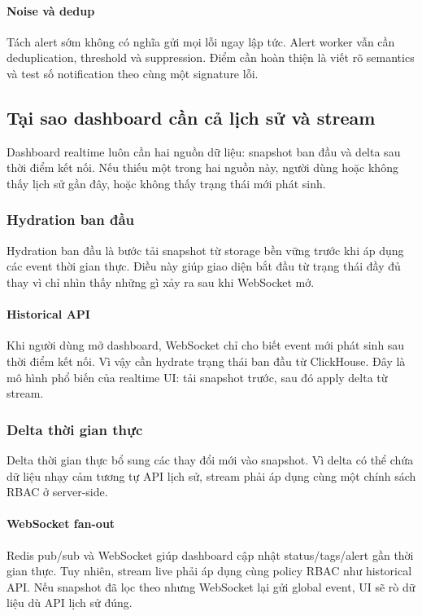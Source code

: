 \paragraph{Noise và dedup}
Tách alert sớm không có nghĩa gửi mọi lỗi ngay lập tức. Alert worker vẫn cần deduplication, threshold và suppression. Điểm cần hoàn thiện là viết rõ semantics và test số notification theo cùng một signature lỗi.

\subsection{Tại sao dashboard cần cả lịch sử và stream}

Dashboard realtime luôn cần hai nguồn dữ liệu: snapshot ban đầu và delta sau thời điểm kết nối. Nếu thiếu một trong hai nguồn này, người dùng hoặc không thấy lịch sử gần đây, hoặc không thấy trạng thái mới phát sinh.
\subsubsection{Hydration ban đầu}

Hydration ban đầu là bước tải snapshot từ storage bền vững trước khi áp dụng các event thời gian thực. Điều này giúp giao diện bắt đầu từ trạng thái đầy đủ thay vì chỉ nhìn thấy những gì xảy ra sau khi WebSocket mở.
\paragraph{Historical API}
Khi người dùng mở dashboard, WebSocket chỉ cho biết event mới phát sinh sau thời điểm kết nối. Vì vậy  cần hydrate trạng thái ban đầu từ ClickHouse. Đây là mô hình phổ biến của realtime UI: tải snapshot trước, sau đó apply delta từ stream.
\subsubsection{Delta thời gian thực}

Delta thời gian thực bổ sung các thay đổi mới vào snapshot. Vì delta có thể chứa dữ liệu nhạy cảm tương tự API lịch sử, stream phải áp dụng cùng một chính sách RBAC ở server-side.
\paragraph{WebSocket fan-out}
Redis pub/sub và WebSocket giúp dashboard cập nhật status/tags/alert gần thời gian thực. Tuy nhiên, stream live phải áp dụng cùng policy RBAC như historical API. Nếu snapshot đã lọc theo  nhưng WebSocket lại gửi global event, UI sẽ rò dữ liệu dù API lịch sử đúng.

